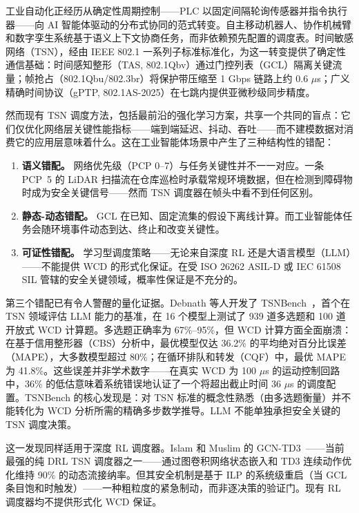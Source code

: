\documentclass[UTF8]{ctexart}
\begin{document}
工业自动化正经历从确定性周期控制——PLC 以固定间隔轮询传感器并指令执行器——向 AI 智能体驱动的分布式协同的范式转变。自主移动机器人、协作机械臂和数字孪生系统基于语义上下文协商任务，而非依赖预先配置的调度表。时间敏感网络（TSN），经由 IEEE 802.1 一系列子标准标准化，为这一转变提供了确定性通信基础：时间感知整形（TAS, 802.1Qbv）通过门控列表（GCL）隔离关键流量；帧抢占（802.1Qbu/802.3br）将保护带压缩至 1 Gbps 链路上约 0.6 $\mu$s；广义精确时间协议（gPTP, 802.1AS-2025）在七跳内提供亚微秒级同步精度。

然而现有 TSN 调度方法，包括最前沿的强化学习方案，共享一个共同的盲点：它们仅优化网络层关键性能指标——端到端延迟、抖动、吞吐——而不建模数据对消费它的应用层意味着什么。这在工业智能体场景中产生了三种结构性的错配：

\begin{enumerate}
\item \textbf{语义错配。} 网络优先级（PCP 0--7）与任务关键性并不一一对应。一条 PCP~5 的 LiDAR 扫描流在仓库巡检时承载常规环境数据，但在检测到障碍物时成为安全关键信号——然而 TSN 调度器在帧头中看不到任何区别。
\item \textbf{静态-动态错配。} GCL 在已知、固定流集的假设下离线计算。而工业智能体任务会随环境事件动态到达、终止和改变关键性。
\item \textbf{可证性错配。} 学习型调度策略——无论来自深度 RL 还是大语言模型（LLM）——不能提供 WCD 的形式化保证。在受 ISO 26262 ASIL-D 或 IEC 61508 SIL 管辖的安全关键领域，概率性保证是不充分的。
\end{enumerate}

第三个错配已有令人警醒的量化证据。Debnath 等人开发了 TSNBench~\cite{debnath2026tsnbench}，首个在 TSN 领域评估 LLM 能力的基准，在 16 个模型上测试了 939 道多选题和 100 道开放式 WCD 计算题。多选题正确率为 67\%--95\%，但 WCD 计算方面全面崩溃：在基于信用整形器（CBS）分析中，最优模型仅达 36.2\% 的平均绝对百分比误差（MAPE），大多数模型超过 80\%；在循环排队和转发（CQF）中，最优 MAPE 为 41.8\%。这些误差并非学术数字——在真实 WCD 为 100 $\mu$s 的运动控制回路中，36\% 的低估意味着系统错误地认证了一个将超出截止时间 36 $\mu$s 的调度配置。TSNBench 的核心发现是：对 TSN 标准的概念性熟悉（由多选题衡量）并不能转化为 WCD 分析所需的精确多步数学推导。LLM 不能单独承担安全关键的 TSN 调度决策。

这一发现同样适用于深度 RL 调度器。Islam 和 Muslim 的 GCN-TD3~\cite{islam2024gcntd3}——当前最强的纯 DRL TSN 调度器之一——通过图卷积网络状态嵌入和 TD3 连续动作优化维持 90\% 的动态流接纳率。但其安全机制是基于 ILP 的系统级重启（当 GCL 条目饱和时触发）——一种粗粒度的紧急制动，而非逐决策的验证门。现有 RL 调度器均不提供形式化 WCD 保证。
\end{document}

